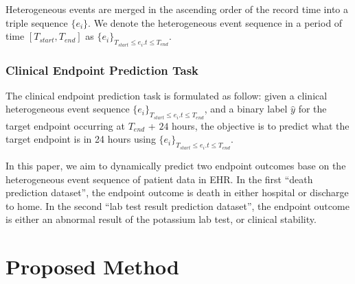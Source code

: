 \documentclass[letterpaper]{article} %
\begin{document}
Heterogeneous events are merged in the ascending order of the record time into a triple sequence $\{e_i\}$. 
We denote the heterogeneous event sequence in a period of time $[T_{start},T_{end}]$ as $\{e_i\}_{T_{start}\leq e_i.t\leq T_{end}}$.

\subsubsection{Clinical Endpoint Prediction Task}

The clinical endpoint prediction task is formulated as follow: given a clinical heterogeneous event sequence $\{e_i\}_{T_{start}\leq e_i.t\leq T_{end}}$, and a binary label $\hat{y}$ for the target endpoint occurring at $ T_{end}$ + $24$ hours, the objective is to predict what the target endpoint is in 24 hours using $\{e_i\}_{T_{start}\leq e_i.t\leq T_{end}}$.

In this paper, we aim to dynamically predict two endpoint outcomes base on the heterogeneous event sequence of patient data in EHR. In the first ``death prediction dataset'', the endpoint outcome is death in either hospital or discharge to home. In the second ``lab test result prediction dataset'', the endpoint outcome is either an abnormal result of the potassium lab test, or clinical stability. 




\section{Proposed Method}

\end{document}
